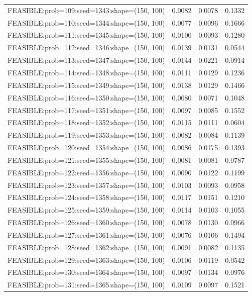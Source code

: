 \begin{longtable}{lccc}
FEASIBLE:prob=109:seed=1343:shape=(150, 100) & 0.0082 & 0.0078 & 0.1332 \\
FEASIBLE:prob=110:seed=1344:shape=(150, 100) & 0.0077 & 0.0096 & 0.1666 \\
FEASIBLE:prob=111:seed=1345:shape=(150, 100) & 0.0100 & 0.0093 & 0.1280 \\
FEASIBLE:prob=112:seed=1346:shape=(150, 100) & 0.0139 & 0.0131 & 0.0544 \\
FEASIBLE:prob=113:seed=1347:shape=(150, 100) & 0.0144 & 0.0221 & 0.0914 \\
FEASIBLE:prob=114:seed=1348:shape=(150, 100) & 0.0111 & 0.0129 & 0.1236 \\
FEASIBLE:prob=115:seed=1349:shape=(150, 100) & 0.0138 & 0.0129 & 0.1466 \\
FEASIBLE:prob=116:seed=1350:shape=(150, 100) & 0.0080 & 0.0071 & 0.1048 \\
FEASIBLE:prob=117:seed=1351:shape=(150, 100) & 0.0097 & 0.0085 & 0.1552 \\
FEASIBLE:prob=118:seed=1352:shape=(150, 100) & 0.0115 & 0.0111 & 0.0604 \\
FEASIBLE:prob=119:seed=1353:shape=(150, 100) & 0.0082 & 0.0084 & 0.1139 \\
FEASIBLE:prob=120:seed=1354:shape=(150, 100) & 0.0086 & 0.0175 & 0.1393 \\
FEASIBLE:prob=121:seed=1355:shape=(150, 100) & 0.0081 & 0.0081 & 0.0787 \\
FEASIBLE:prob=122:seed=1356:shape=(150, 100) & 0.0090 & 0.0122 & 0.1199 \\
FEASIBLE:prob=123:seed=1357:shape=(150, 100) & 0.0103 & 0.0093 & 0.0958 \\
FEASIBLE:prob=124:seed=1358:shape=(150, 100) & 0.0117 & 0.0151 & 0.1210 \\
FEASIBLE:prob=125:seed=1359:shape=(150, 100) & 0.0114 & 0.0103 & 0.1055 \\
FEASIBLE:prob=126:seed=1360:shape=(150, 100) & 0.0078 & 0.0130 & 0.0966 \\
FEASIBLE:prob=127:seed=1361:shape=(150, 100) & 0.0076 & 0.0106 & 0.1494 \\
FEASIBLE:prob=128:seed=1362:shape=(150, 100) & 0.0091 & 0.0082 & 0.1135 \\
FEASIBLE:prob=129:seed=1363:shape=(150, 100) & 0.0106 & 0.0119 & 0.0542 \\
FEASIBLE:prob=130:seed=1364:shape=(150, 100) & 0.0097 & 0.0134 & 0.0976 \\
FEASIBLE:prob=131:seed=1365:shape=(150, 100) & 0.0109 & 0.0097 & 0.1521 \\

\end{longtable}
